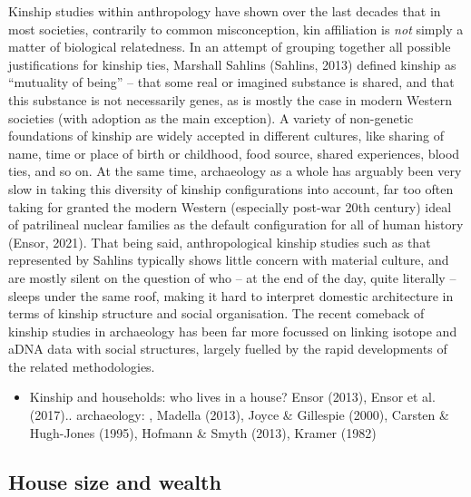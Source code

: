 \documentclass[
  12pt,
]{book}
\providecommand{\tightlist}{%
  \setlength{\itemsep}{0pt}\setlength{\parskip}{0pt}}
\begin{document}
Kinship studies within anthropology have shown over the last decades that in most societies, contrarily to common misconception, kin affiliation is \emph{not} simply a matter of biological relatedness. In an attempt of grouping together all possible justifications for kinship ties, Marshall Sahlins (Sahlins, 2013) defined kinship as ``mutuality of being'' -- that some real or imagined substance is shared, and that this substance is not necessarily genes, as is mostly the case in modern Western societies (with adoption as the main exception). A variety of non-genetic foundations of kinship are widely accepted in different cultures, like sharing of name, time or place of birth or childhood, food source, shared experiences, blood ties, and so on. At the same time, archaeology as a whole has arguably been very slow in taking this diversity of kinship configurations into account, far too often taking for granted the modern Western (especially post-war 20th century) ideal of patrilineal nuclear families as the default configuration for all of human history (Ensor, 2021). That being said, anthropological kinship studies such as that represented by Sahlins typically shows little concern with material culture, and are mostly silent on the question of who -- at the end of the day, quite literally -- sleeps under the same roof, making it hard to interpret domestic architecture in terms of kinship structure and social organisation. The recent comeback of kinship studies in archaeology has been far more focussed on linking isotope and aDNA data with social structures, largely fuelled by the rapid developments of the related methodologies.

\begin{itemize}
\tightlist
\item
  Kinship and households: who lives in a house? Ensor (2013), Ensor et al. (2017).. archaeology: , Madella (2013), Joyce \& Gillespie (2000), Carsten \& Hugh-Jones (1995), Hofmann \& Smyth (2013), Kramer (1982)
\end{itemize}

\hypertarget{house-size-and-wealth}{%
\subsection{House size and wealth}\label{house-size-and-wealth}}
\end{document}
